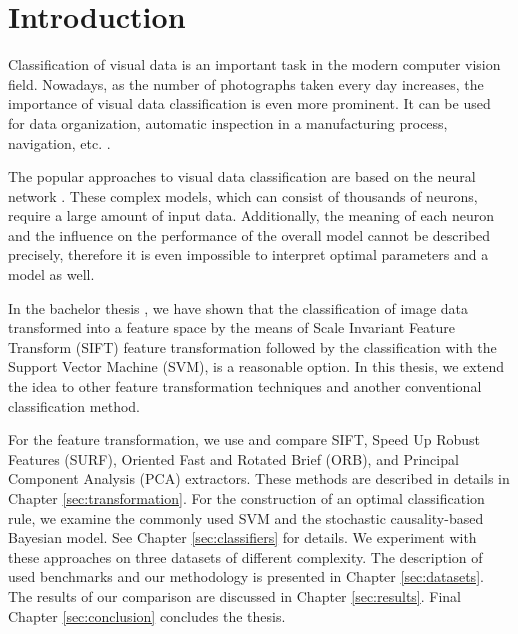 \chapter{Introduction}
Classification of visual data is an important task in the modern computer vision field. Nowadays, as the number of photographs taken every day increases, the importance of visual data classification is even more prominent. It can be used for data organization, automatic inspection in a manufacturing process, navigation, etc. \cite{wiki:Computer_vision}.

The popular approaches to visual data classification are based on the neural network \cite{da2017}. These complex models, which can consist of thousands of neurons, require a large amount of input data. Additionally, the meaning of each neuron and the influence on the performance of the overall model cannot be described precisely, therefore it is even impossible to interpret optimal parameters and a model as well.

In the bachelor thesis \cite{dornak2019}, we have shown that the classification of image data transformed into a feature space by the means of Scale Invariant Feature Transform (SIFT) feature transformation followed by the classification with the Support Vector Machine (SVM), is a reasonable option. In this thesis, we extend the idea to other feature transformation techniques and another conventional classification method.

For the feature transformation, we use and compare SIFT, Speed Up Robust Features (SURF), Oriented Fast and Rotated Brief (ORB), and Principal Component Analysis (PCA) extractors. These methods are described in details in Chapter \ref{sec:transformation}. For the construction of an optimal classification rule, we examine the commonly used SVM and the stochastic causality-based Bayesian model. See Chapter \ref{sec:classifiers} for details. We experiment with these approaches on three datasets of different complexity. The description of used benchmarks and our methodology is presented in Chapter \ref{sec:datasets}. The results of our comparison are discussed in Chapter \ref{sec:results}. Final Chapter \ref{sec:conclusion} concludes the thesis.
